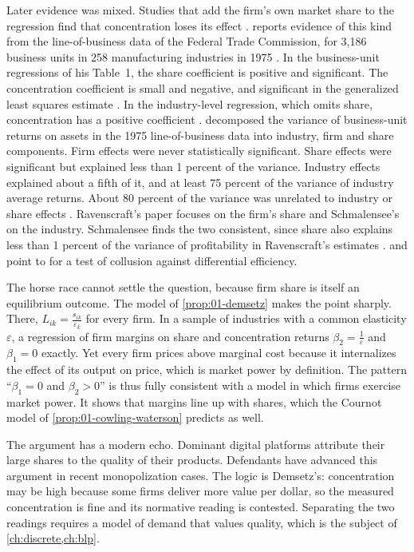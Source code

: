 Later evidence was mixed. Studies that add the firm's own market share to the regression find that concentration
loses its effect \citep[Introduction, note~3]{Tirole1988}. \citet{Ravenscraft1983} reports evidence of
this kind from the line-of-business data of the Federal Trade Commission, for 3,186 business units in 258
manufacturing industries in 1975 \citep[p.~24]{Ravenscraft1983}. In the business-unit regressions of his
Table~1, the share coefficient is positive and significant. The concentration coefficient is small and negative, and significant in the generalized least squares
estimate \citep[Table~1]{Ravenscraft1983}. In the industry-level regression, which omits share, concentration has
a positive coefficient \citep[p.~26]{Ravenscraft1983}.
\citet{Schmalensee1985a} decomposed the variance of business-unit returns on assets in the 1975 line-of-business
data into industry, firm and share components. Firm effects were never statistically significant. Share effects
were significant but explained less than 1 percent of the variance. Industry effects explained about a fifth of
it, and at least 75 percent of the variance of industry average returns. About 80 percent of the variance was
unrelated to industry or share effects \citep[pp.~346--350]{Schmalensee1985a}.
Ravenscraft's paper focuses on the firm's share and Schmalensee's on the industry. Schmalensee finds the two
consistent, since share also explains less than 1 percent of the variance of profitability in Ravenscraft's
estimates \citep[p.~347]{Schmalensee1985a}. \citet[Section~5.5]{Tirole1988} and \citet[p.~46, n.~5]{LevensteinSuslow2006} point to
\citet{Schmalensee1987} for a test of collusion against differential efficiency.

The horse race cannot settle the question, because firm share is itself an equilibrium outcome. The model
of \cref{prop:01-demsetz} makes the point sharply. There, $L_{ik} = \frac{s_{ik}}{\varepsilon_k}$ for
every firm. In a sample of industries with a common elasticity $\varepsilon$, a regression of firm
margins on share and concentration returns $\beta_2 = \frac{1}{\varepsilon}$ and $\beta_1 = 0$ exactly.
Yet every firm prices above marginal cost because it internalizes the effect of its output on price,
which is market power by definition. The pattern ``$\beta_1 = 0$ and $\beta_2 > 0$'' is thus fully
consistent with a model in which firms exercise market power. It shows that margins line up with shares,
which the Cournot model of \cref{prop:01-cowling-waterson} predicts as well.

The argument has a modern echo. Dominant digital platforms attribute their large shares to the quality of
their products. Defendants have advanced this argument in recent monopolization cases. The logic is
Demsetz's: concentration may be high because some firms deliver more value per dollar, so the measured
concentration is fine and its normative reading is contested. Separating the two readings requires a
model of demand that values quality, which is the subject of \cref{ch:discrete,ch:blp}.


